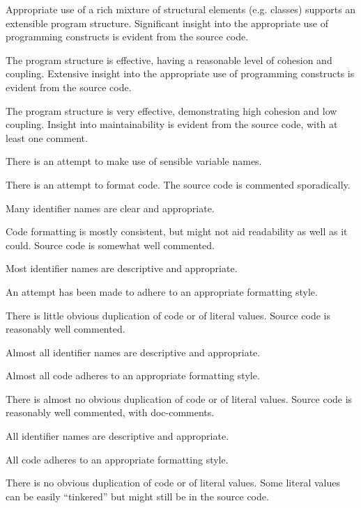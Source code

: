 \documentclass{../../fal_assignment}
\begin{document}
\begin{markingrubric}
            \par Appropriate use of a rich mixture of structural elements (e.g. classes) supports an extensible program structure.
        \grade Significant insight into the appropriate use of programming constructs is evident from the source code.
            \par The program structure is effective, having a reasonable level of cohesion and coupling.
        \grade Extensive insight into the appropriate use of programming constructs is evident from the source code.
            \par The program structure is very effective, demonstrating high cohesion and low coupling.
%
        \grade\fail Insight into maintainability is evident from the source code, with at least one comment.
            \par There is an attempt to make use of sensible variable names.
            \par There is an attempt to format code.
        \grade The source code is commented sporadically.
            \par Many identifier names are clear and appropriate.
            \par Code formatting is mostly consistent, but might not aid readability as well as it could.
        \grade Source code is somewhat well commented.
            \par Most identifier names are descriptive and appropriate.
            \par An attempt has been made to adhere to an appropriate formatting style.
             \par There is little obvious duplication of code or of literal values.           
        \grade Source code is reasonably well commented.
            \par Almost all identifier names are descriptive and appropriate.
            \par Almost all code adheres to an appropriate formatting style.
             \par There is almost no obvious duplication of code or of literal values.   
        \grade Source code is reasonably well commented, with doc-comments.
            \par All identifier names are descriptive and appropriate.
            \par All code adheres to an appropriate formatting style.
             \par There is no obvious duplication of code or of literal values. Some literal values can be easily ``tinkered'' but might still be in the source code. 

\end{markingrubric}
\end{document}
